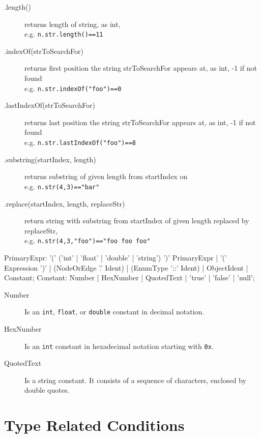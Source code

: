 \begin{description}
\item[.length()] returns length of string, as int, \\
 e.g. \texttt{n.str.length()==11}
\item[.indexOf(strToSearchFor)] returns first position the string strToSearchFor appears at, as int, -1 if not found \\
 e.g. \texttt{n.str.indexOf("foo")==0}
\item[.lastIndexOf(strToSearchFor)] returns last position the string strToSearchFor appears at, as int, -1 if not found \\
 e.g. \texttt{n.str.lastIndexOf("foo")==8}
\item[.substring(startIndex, length)] returns substring of given length from startIndex on \\
 e.g. \texttt{n.str(4,3)=="bar"}
\item[.replace(startIndex, length, replaceStr)] return string with substring from startIndex of given length replaced by replaceStr, \\
 e.g. \texttt{n.str(4,3,"foo")=="foo foo foo"}
\end{description}

\begin{rail} 
  PrimaryExpr: '(' ('int' | 'float' | 'double' | 'string') ')' PrimaryExpr | '(' Expression ')' | (NodeOrEdge '.' Ident) | (EnumType '::' Ident) | ObjectIdent | Constant;
  Constant: Number | HexNumber | QuotedText | 'true' | 'false' | 'null';
\end{rail}
\begin{description}
  \item[Number] Is an \texttt{int}, \texttt{float}, or \texttt{double} constant in decimal notation.
  \item[HexNumber] Is an \texttt{int} constant in hexadecimal notation starting with \texttt{0x}.
  \item[QuotedText] Is a string constant. It consists of a sequence of characters, enclosed by double quotes.
\end{description}

\section{Type Related Conditions}
\label{typeexpressions}

